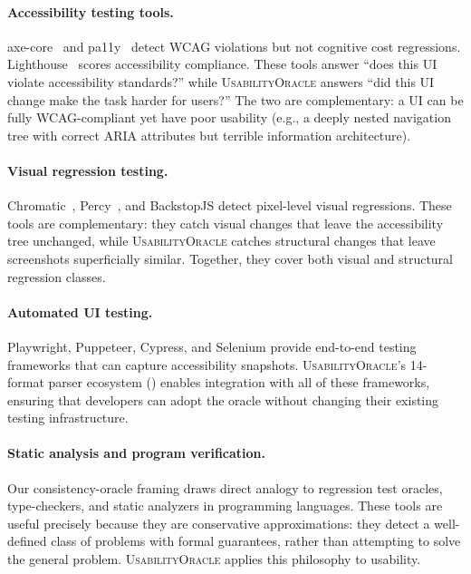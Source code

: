 \documentclass[11pt,twocolumn]{article}
\theoremstyle{definition}
\newcommand{\tool}{\textsc{UsabilityOracle}}
\begin{document}
\paragraph{Accessibility testing tools.}
axe-core~\citep{axecore2023} and pa11y~\citep{pa11y2023} detect WCAG violations but not cognitive cost regressions.
Lighthouse~\citep{lighthouse2023} scores accessibility compliance.
These tools answer ``does this UI violate accessibility standards?'' while \tool{} answers ``did this UI change make the task harder for users?''
The two are complementary: a UI can be fully WCAG-compliant yet have poor usability (e.g., a deeply nested navigation tree with correct ARIA attributes but terrible information architecture).

\paragraph{Visual regression testing.}
Chromatic~\citep{chromatic2023}, Percy~\citep{percy2023}, and BackstopJS detect pixel-level visual regressions.
These tools are complementary: they catch visual changes that leave the accessibility tree unchanged, while \tool{} catches structural changes that leave screenshots superficially similar.
Together, they cover both visual and structural regression classes.

\paragraph{Automated UI testing.}
Playwright, Puppeteer, Cypress, and Selenium provide end-to-end testing frameworks that can capture accessibility snapshots.
\tool{}'s 14-format parser ecosystem () enables integration with all of these frameworks, ensuring that developers can adopt the oracle without changing their existing testing infrastructure.

\paragraph{Static analysis and program verification.}
Our consistency-oracle framing draws direct analogy to regression test oracles, type-checkers, and static analyzers in programming languages.
These tools are useful precisely because they are conservative approximations: they detect a well-defined class of problems with formal guarantees, rather than attempting to solve the general problem.
\tool{} applies this philosophy to usability.

\end{document}
